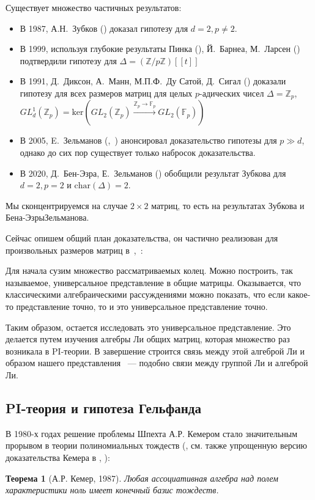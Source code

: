 \documentclass[12pt,a4paper]{article}
\newtheorem*{theorem*}{Теорема}
\begin{document}
    Существует множество частичных результатов:
    \begin{itemize}
        \item В 1987, А.Н.\ Зубков (\cite{Zubkov}) доказал гипотезу для $d=2, p\neq2$.
        \item В 1999, используя глубокие результаты Пинка (\cite{Pink}), Й.\ Барнеа, М.\ Ларсен (\cite{Barnea-Larsen}) подтвердили гипотезу для $\Delta=\left( \mathbb{Z}/p\mathbb{Z} \right)[[t]]$
        \item В 1991, Д.\ Диксон, А.\ Манн, М.П.Ф.\ Ду Сатой, Д.\ Сигал (\cite{DMSD}) доказали гипотезу для всех размеров матриц для целых $p$-адических чисел $\Delta=\mathbb{Z}_p$, $GL_d^1(\mathbb{Z}_p)=\mathrm{ker}\left( GL_2(\mathbb{Z}_p) \xrightarrow{\mathbb{Z}_p\to\mathbb{F}_p} GL_2(\mathbb{F}_p) \right)$
        \item В 2005, E.\ Зельманов (\cite{Zelmanov1},~\cite{Zelmanov2}) анонсировал доказательство гипотезы для $p\gg d$, однако до сих пор существует только набросок доказательства.
        \item В 2020, Д.\ Бен-Эзра, Е.\ Зельманов (\cite{Ben-Ezra-Zelmanov}) обобщили результат Зубкова для $d=2, p=2$ и $\mathrm{char}(\Delta)=2$.
    \end{itemize}

    Мы сконцентрируемся на случае $2\times 2$ матриц, то есть на результатах Зубкова и Бена-Эзры\textemdash Зельманова.

    Сейчас опишем общий план доказательства, он частично реализован для произвольных размеров матриц в\ \cite{Zelmanov1},\ \cite{Zelmanov2}:

    Для начала сузим множество рассматриваемых колец.
    Можно построить, так называемое, универсальное представление в общие матрицы.
    Оказывается, что классическими алгебраическими рассуждениями можно показать, что если какое-то представление точно, то и это универсальное представление точно.

    Таким образом, остается исследовать это универсальное представление.
    Это делается путем изучения алгебры Ли общих матриц, которая множество раз возникала в PI-теории.
    В завершение строится связь между этой алгеброй Ли и образом нашего представления ~--- подобно связи между группой Ли и алгеброй Ли.

    \subsection{PI-теория и гипотеза Гельфанда}
    В 1980-х годах решение проблемы Шпехта А.Р. Кемером стало значительным прорывом в теории полиномиальных тождеств (\cite{Kemer}, см. также упрощенную версию доказательства Кемера в \cite{SimpleKemer}, \cite{Procesi}):
    \vskip 0.1in\noindent
    \begin{theorem*} [А.Р. Кемер, 1987]
        Любая ассоциативная алгебра над полем характеристики ноль имеет конечный базис тождеств.
    \end{theorem*}
    \vskip 0.1in\noindent
\end{document}
